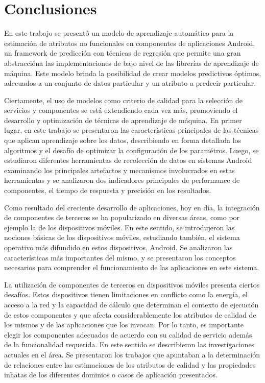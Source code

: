 
\chapter{Conclusiones\label{chap:Conclusiones}}

En este trabajo se presentó un modelo de aprendizaje automático para
la estimación de atributos no funcionales en componentes de aplicaciones
Android, un framework de predicción con técnicas de regresión que
permite una gran abstraccióna las implementaciones de bajo nivel de
las librerías de aprendizaje de máquina. Este modelo brinda la posibilidad
de crear modelos predictivos óptimos, adecuados a un conjunto de datos
particular y un atributo a predecir particular.

Ciertamente, el uso de modelos como criterio de calidad para la selección
de servicios y componentes se está extendiendo cada vez más, promoviendo
el desarrollo y optimización de técnicas de aprendizaje de máquina.
En primer lugar, en este trabajo se presentaron las características
principales de las técnicas que aplican aprendizaje sobre los datos,
describiendo en forma detallada los algoritmos y el desafío de optimizar
la configuración de los paramétros. Luego, se estudiaron diferentes
herramientas de recolección de datos en sistemas Android examinando
los principales artefactos y mecanismos involucrados en estas herramientas
y se analizaron dos indicadores principales de performance de componentes,
el tiempo de respuesta y precisión en los resultados. 

Como resultado del creciente desarrollo de aplicaciones, hoy en día,
la integración de componentes de terceros se ha popularizado en diversas
áreas, como por ejemplo la de los dispositivos móviles. En este sentido,
se introdujeron las nociones básicas de los dispositivos móviles,
estudiando también, el sistema operativo más difundido en estos dispositivos,
Android. Se analizaron las características más importantes del mismo,
y se presentaron los conceptos necesarios para comprender el funcionamiento
de las aplicaciones en este sistema.

La utilización de componentes de terceros en dispositivos móviles
presenta ciertos desafíos. Estos dispositivos tienen limitaciones
en conflicto como la energía, el acceso a la red y la capacidad de
cálculo que determinan el contexto de ejecución de estos componentes
y que afecta considerablemente los atributos de calidad de los mismos
y de las aplicaciones que los invocan. Por lo tanto, es importante
elegir los componentes adecuados de acuerdo con su calidad de servicio
además de la funcionalidad requerida. En este sentido se describieron
las investigaciones actuales en el área. Se presentaron los trabajos
que apuntaban a la determinación de relaciones entre las estimaciones
de los atributos de calidad y las propiedades inhatas de los diferentes
dominios o casos de aplicación presentados. 

